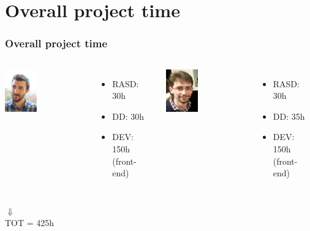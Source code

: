 \documentclass[professionalfont]{beamer}
\begin{document}
\section{Overall project time}
\begin{frame}
\frametitle{Overall project time}
\begin{columns}[c]
\includegraphics[width=0.4\textwidth]{images/andrea}
\begin{itemize}
\item RASD: 30h
\item DD: 30h
\item DEV: 150h (front-end)
\end{itemize}

\includegraphics[width=0.4\textwidth]{images/stefano}
\begin{itemize}
\item RASD: 30h
\item DD: 35h
\item DEV: 150h (front-end)
\end{itemize}
\end{columns}
\begin{center}
$\Downarrow$\\
TOT = 425h
\end{center}
\end{frame}
\end{document}
